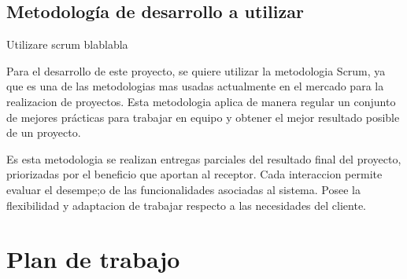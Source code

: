 \subsection{Metodología de desarrollo a utilizar}

Utilizare scrum blablabla

Para el desarrollo de este proyecto, se quiere utilizar la metodologia Scrum, ya que es una de las metodologias mas usadas actualmente en el mercado para la realizacion de proyectos. Esta metodologia aplica de manera regular un conjunto de mejores prácticas para trabajar en equipo y obtener el mejor resultado posible de un proyecto.

Es esta metodologia se realizan entregas parciales del resultado final del proyecto, priorizadas por el beneficio que aportan al receptor. Cada interaccion permite evaluar el desempe;o de las funcionalidades asociadas al sistema. Posee la flexibilidad y adaptacion de trabajar respecto a las necesidades del cliente. 









\section{Plan de trabajo}
